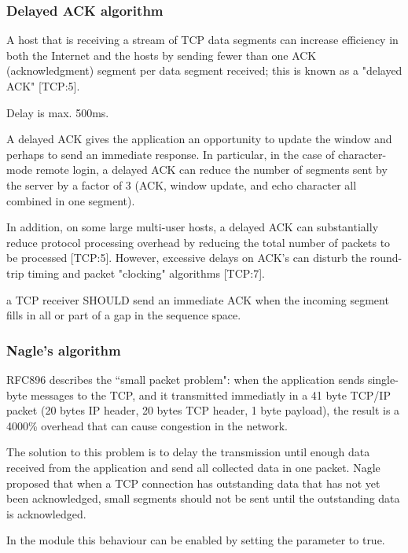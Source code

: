 \subsubsection*{Delayed ACK algorithm}


A host that is receiving a stream of TCP data segments can
increase efficiency in both the Internet and the hosts by
sending fewer than one ACK (acknowledgment) segment per data
segment received; this is known as a "delayed ACK" [TCP:5].

Delay is max. 500ms.

A delayed ACK gives the application an opportunity to
update the window and perhaps to send an immediate
response.  In particular, in the case of character-mode
remote login, a delayed ACK can reduce the number of
segments sent by the server by a factor of 3 (ACK,
window update, and echo character all combined in one
segment).

In addition, on some large multi-user hosts, a delayed
ACK can substantially reduce protocol processing
overhead by reducing the total number of packets to be
processed [TCP:5].  However, excessive delays on ACK's
can disturb the round-trip timing and packet "clocking"
algorithms [TCP:7].


a TCP receiver SHOULD send an immediate ACK
when the incoming segment fills in all or part of a gap in the
sequence space.

\subsubsection*{Nagle's algorithm}

RFC896 describes the ``small packet problem": when the application
sends single-byte messages to the TCP, and it transmitted immediatly
in a 41 byte TCP/IP packet (20 bytes IP header, 20 bytes TCP header,
1 byte payload), the result is a 4000\% overhead that can cause
congestion in the network.

The solution to this problem is to delay the transmission until
enough data received from the application and send all collected
data in one packet. Nagle proposed that
when a TCP connection has outstanding data that has not
yet been acknowledged, small segments should not be sent
until the outstanding data is acknowledged.

In the  module this behaviour can be enabled
by setting the  parameter to true.

